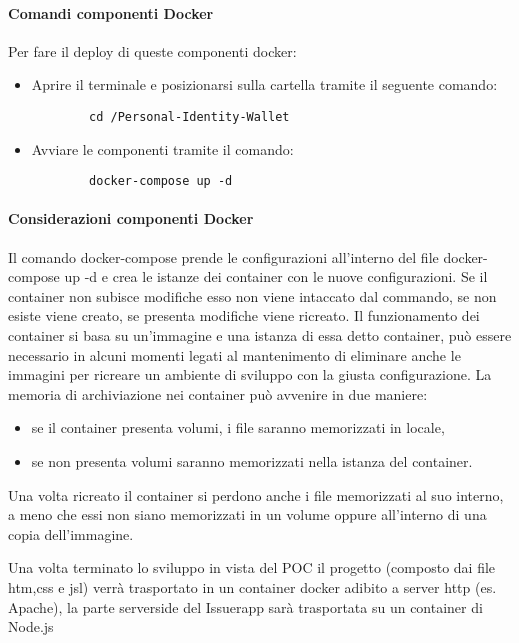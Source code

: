 \paragraph{Comandi componenti Docker}
Per fare il deploy di queste componenti docker:
\begin{itemize}
    \item Aprire il terminale e posizionarsi sulla cartella tramite il seguente comando: 
    \begin{verbatim}
        cd /Personal-Identity-Wallet
    \end{verbatim}
    \item Avviare le componenti tramite il comando:
    \begin{verbatim}
        docker-compose up -d
    \end{verbatim}
\end{itemize}

\paragraph{Considerazioni componenti Docker}
Il comando docker-compose prende le configurazioni all’interno del file docker-compose up -d e crea le istanze dei container con le nuove configurazioni. Se il container non subisce modifiche esso non viene intaccato dal commando, se non esiste viene creato, se presenta modifiche viene ricreato.
Il funzionamento dei container si basa su un'immagine e una istanza di essa detto container, può essere necessario in alcuni momenti legati al mantenimento di eliminare anche le immagini per ricreare un ambiente di sviluppo con la giusta configurazione.
La memoria di archiviazione nei container può avvenire in due maniere:
\begin{itemize}
    \item se il container presenta volumi, i file saranno memorizzati in locale,
    \item se non presenta volumi saranno memorizzati nella istanza del container.
\end{itemize} 
Una volta ricreato il container si perdono anche i file memorizzati al suo interno, a meno che essi non siano memorizzati in un volume oppure all’interno di una copia dell’immagine.

Una volta terminato lo sviluppo in vista del POC il progetto (composto dai file htm,css e jsl) verrà trasportato in un container docker adibito a server http (es. Apache), la parte serverside del Issuerapp sarà trasportata su un container di Node.js






